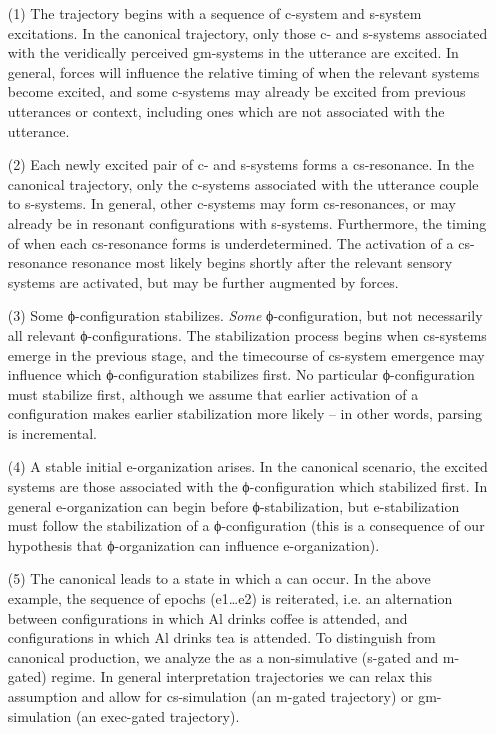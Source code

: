 \begin{enumerate}
\item[(1)]
The trajectory begins with a sequence of c-sys\-tem and s-sys\-tem excitations. In the canonical trajectory, only those c- and s-sys\-tems associated with the veridically perceived gm-sys\-tems in the utterance are excited. In general,  forces will influence the relative timing of when the relevant systems become excited, and some c-sys\-tems may already be excited from previous utterances or context, including ones which are not associated with the utterance. 
\item[(2)]
Each newly excited pair of c- and s-sys\-tems forms a cs-resonance. In the canonical trajectory, only the c-sys\-tems associated with the utterance couple to s-sys\-tems. In general, other c-sys\-tems may form cs-resonances, or may already be in resonant configurations with s-sys\-tems. Furthermore, the timing of when each cs-resonance forms is underdetermined. The activation of a cs-resonance resonance most likely begins shortly after the relevant sensory systems are activated, but may be further augmented by  forces.
\item[(3)]
Some ϕ-con\-fi\-gu\-ra\-tion stabilizes. \textit{Some} ϕ-con\-fi\-gu\-ra\-tion, but not necessarily all relevant ϕ-con\-fi\-gu\-ra\-tions. The stabilization process begins when cs-sys\-tems emerge in the previous stage, and the timecourse of cs-sys\-tem emergence may influence which ϕ-con\-fi\-gu\-ra\-tion stabilizes first. No particular ϕ-con\-fi\-gu\-ra\-tion must stabilize first, although we assume that earlier activation of a configuration makes earlier stabilization more likely -- in other words, parsing is incremental. 
\item[(4)]
A stable initial e-or\-ga\-ni\-za\-tion arises. In the canonical scenario, the excited systems are those associated with the ϕ-con\-fi\-gu\-ra\-tion which stabilized first. In general e-or\-ga\-ni\-za\-tion can begin before ϕ-stabilization, but e-stabilization must follow the stabilization of a ϕ-con\-fi\-gu\-ra\-tion (this is a consequence of our hypothesis that ϕ-or\-ga\-ni\-za\-tion can influence e-or\-ga\-ni\-za\-tion). 
\item[(5)]
The canonical  leads to a state in which a  can occur. In the above example, the sequence of epochs (e1…e2) is reiterated, i.e. an alternation between configurations in which {\textbar}Al drinks coffee{\textbar} is attended, and configurations in which {\textbar}Al drinks tea{\textbar} is attended. To distinguish  from canonical production, we analyze the  as a non-simulative (s-gated and m-gated) regime. In general interpretation trajectories we can relax this assumption and allow for cs-simulation (an m-gated trajectory) or gm-simulation (an exec-gated trajectory).
\end{enumerate}

